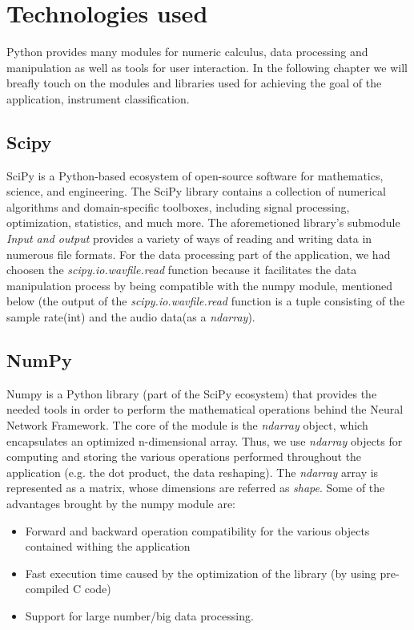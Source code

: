 \chapter{Technologies used}
Python provides many modules for numeric calculus, data processing and manipulation as  well as tools for user interaction.
In the following chapter we will breafly touch on the modules and libraries used for achieving the goal
of the application, instrument classification.

\section{Scipy}
SciPy is a Python-based ecosystem of open-source software for mathematics, science, and engineering. The SciPy library contains a collection of numerical algorithms and domain-specific toolboxes, including signal processing, optimization, statistics, and much more.\cite{scpd}
The aforemetioned library's submodule \textit{Input and output} provides a variety of ways of reading and writing data in numerous file formats. For the data processing part of the application, we had choosen the \textit{scipy.io.wavfile.read} function because it facilitates the data manipulation process by being compatible with the numpy module, mentioned below (the output of the \textit{scipy.io.wavfile.read} function is a tuple consisting of the sample rate(int) and the audio data(as a \textit{ndarray}).
\section{NumPy}
Numpy is a Python library (part of the SciPy ecosystem) that provides the needed tools in order to perform the mathematical operations behind
the Neural Network Framework. The core of the module is the \textit{ndarray} object, which encapsulates an
optimized n-dimensional array. Thus, we use \textit{ndarray} objects for computing and storing the various
operations performed throughout the application (e.g. the dot product, the data reshaping). The \textit{ndarray}
array is represented as a matrix, whose dimensions are referred as \textit{shape}.
Some of the advantages brought by the numpy module are:
\begin{itemize}
	\item Forward and backward operation compatibility for the various objects contained withing the application
	\item Fast execution time caused by the optimization of the library \cite{npd} (by using pre-compiled C code)
	\item Support for large number/big data processing.
\end{itemize}

